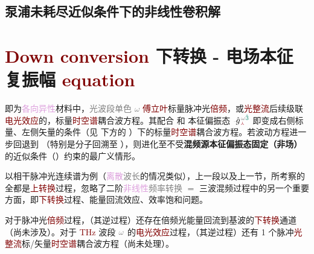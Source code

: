 \subsection{泵浦未耗尽近似条件下的非线性卷积解}\label{ssec:undepleted-pump-approximation}

\vspace*{-1.0em}

\section{\textcolor{Maroon}{Down conversion} 下转换 - 电场本征复振幅 \textcolor{Maroon}{equation}}\label{sec:down_convert}

 即为\textcolor{Plum}{各向异性}材料中，\textcolor{gray}{光波段单色 $\omega$} \textcolor{Maroon}{傅立叶}标量\textcolor{NavyBlue}{脉冲光}\textcolor{Maroon}{倍频}，或\textcolor{Maroon}{光整流}后续级联\textcolor{Maroon}{电光效应}的，标量\textcolor{Maroon}{时空谱}耦合波方程。其配合  和 \textcolor{PineGreen}{本征偏振态} $\Xint{{}^{}_{\mathcolor{gray}{-}}}{10}{\hat{g}}^{\;\!\mathcolor{gray}{\omega} \textcolor{PineGreen}{\hat{3}}}_{\;\! \textcolor{Maroon}{\Yup}}$ 即变成右侧标量、左侧矢量的条件（见  下方的 ）下的标量\textcolor{Maroon}{时空谱}耦合波方程。若波动方程进一步回退到 （特别是分子回溯至 ），则进化至不受\textbf{\textcolor{NavyBlue}{混频源}\textcolor{PineGreen}{本征偏振态}固定（非场）}的近似条件（）约束的最广义情形。

以相干\textcolor{NavyBlue}{脉冲光连续谱}为例（\textcolor{Plum}{离散}\textcolor{gray}{波长}的情况类似），上一段以及上一节，所考察的全都是\textcolor{Maroon}{上转换}过程，忽略了二阶\textcolor{Plum}{非线性}\textcolor{gray}{频率转换} $=$ \textcolor{NavyBlue}{三波混频}过程中的另一个重要方面，即\textcolor{Maroon}{下转换}过程、\textcolor{NavyBlue}{能量回流}效应、\textcolor{NavyBlue}{效率饱和}问题。

对于\textcolor{NavyBlue}{脉冲光}\textcolor{Maroon}{倍频}过程，（其逆过程）还存在\textcolor{NavyBlue}{倍频光}能量回流到基波的\textcolor{Maroon}{下转换}通道（尚未涉及）。对于 \textcolor{Maroon}{THz} 波段 $\textcolor{gray}{\omega}$ 的\textcolor{Maroon}{电光效应}过程，（其逆过程）还有 1 个\textcolor{NavyBlue}{脉冲}\textcolor{Maroon}{光整流}标/矢量\textcolor{Maroon}{时空谱}耦合波方程（尚未处理）。

